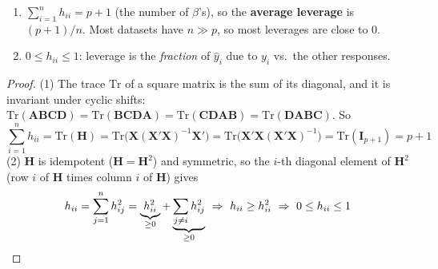 \begin{proposition}
    \begin{enumerate}
        \item $\sum_{i=1}^nh_{ii}=p+1$ (the number of $\beta$'s), so the \textbf{average leverage}
        is $(p+1)/n$. Most datasets have $n\gg p$, so most leverages are close to 0.
        \item $0\leq h_{ii}\leq1$: leverage is the \emph{fraction} of $\hat y_i$ due to $y_i$
        vs.\ the other responses.
    \end{enumerate}
\end{proposition}

\begin{proof}
    (1) The trace $\mathrm{Tr}$ of a square matrix is the sum of its diagonal, and it is
    invariant under cyclic shifts: $\mathrm{Tr}(\mathbf{ABCD})=\mathrm{Tr}(\mathbf{BCDA})=\mathrm{Tr}(\mathbf{CDAB})=\mathrm{Tr}(\mathbf{DABC})$. So
    \[\sum_{i=1}^nh_{ii}=\mathrm{Tr}(\mathbf{H})=\mathrm{Tr}\big(\mathbf{X}(\mathbf{X}'\mathbf{X})^{-1}\mathbf{X}'\big)
    =\mathrm{Tr}\big(\mathbf{X}'\mathbf{X}(\mathbf{X}'\mathbf{X})^{-1}\big)=\mathrm{Tr}(\mathbf{I}_{p+1})=p+1\]
    (2) $\mathbf{H}$ is idempotent ($\mathbf{H}=\mathbf{H}^2$) and symmetric, so the $i$-th
    diagonal element of $\mathbf{H}^2$ (row $i$ of $\mathbf{H}$ times column $i$ of $\mathbf{H}$) gives
    \[h_{ii}=\sum_{j=1}^nh_{ij}^2=\underbrace{h_{ii}^2}_{\geq0}+\underbrace{\sum_{j\neq i}h_{ij}^2}_{\geq0}
    \ \Rightarrow\ h_{ii}\geq h_{ii}^2\ \Rightarrow\ 0\leq h_{ii}\leq1\qedhere\]
\end{proof}

